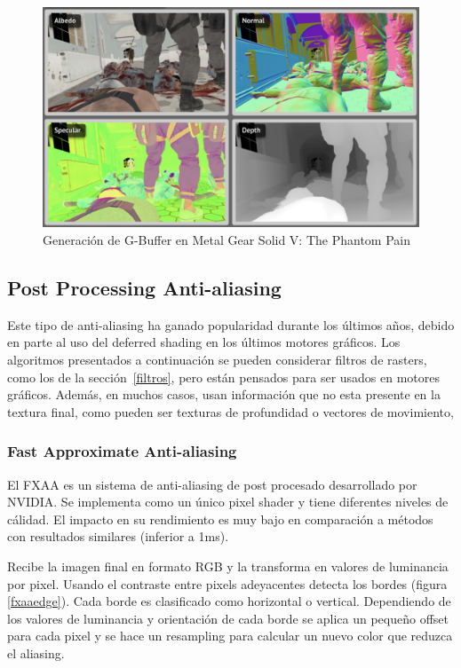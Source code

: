 \documentclass[withindex, glossary]{cam-thesis}
\begin{document}
\begin{figure}[!htbp]
    \includegraphics[width=\linewidth]{figures/gbuffer.png}
    \caption{Generación de G-Buffer en Metal Gear Solid V\@: The Phantom Pain\cite{analysismgsv}}
    \label{gbuffer}
\end{figure}

\subsection{Post Processing Anti-aliasing}

Este tipo de anti-aliasing ha ganado popularidad durante los últimos años, debido en parte al uso del deferred shading en los últimos motores gráficos. Los algoritmos presentados a continuación se pueden considerar filtros de rasters, como los de la sección~\ref{filtros}, pero están pensados para ser usados en motores gráficos. Además, en muchos casos, usan información que no esta presente en la textura final, como pueden ser texturas de profundidad o vectores de movimiento,

\subsubsection{Fast Approximate Anti-aliasing}

El FXAA\cite{FXAA} es un sistema de anti-aliasing de post procesado desarrollado por NVIDIA\@. Se implementa como un único pixel shader y tiene diferentes niveles de cálidad. El impacto en su rendimiento es muy bajo en comparación a métodos con resultados similares (inferior a 1ms).

Recibe la imagen final en formato RGB y la transforma en valores de luminancia por pixel. Usando el contraste entre pixels adeyacentes detecta los bordes (figura \ref{fxaaedge}). Cada borde es clasificado como horizontal o vertical. Dependiendo de los valores de luminancia y orientación de cada borde se aplica un pequeño offset para cada pixel y se hace un resampling para calcular un nuevo color que reduzca el aliasing\cite{fxaa}\cite{fxaa2}.
\end{document}
